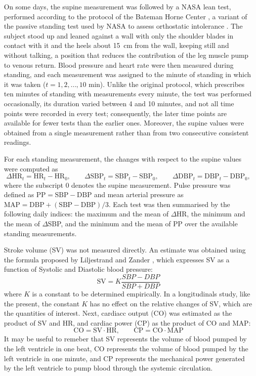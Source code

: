 \documentclass[11pt,a4paper]{article}
\begin{document}
On some days, the supine measurement was followed by a NASA lean test, performed
according to the protocol of the Bateman Horne Center \citep{bhc_nasa_lean}, a
variant of the passive standing test used by NASA to assess orthostatic intolerance
\citep{bungo1985}. The subject stood up and leaned against a wall with only the
shoulder blades in contact with it and the heels about \SI{15}{\centi\metre} from the
wall, keeping still and without talking, a position that reduces the contribution of
the leg muscle pump to venous return. Blood pressure and heart rate were then measured
during standing, and each measurement was assigned to the minute of standing in which
it was taken ($t = 1, 2, \dots, 10$ min). Unlike the original protocol, which
prescribes ten minutes of standing with measurements every minute, the test was
performed occasionally, its duration varied between 4 and 10 minutes, and not all
time points were recorded in every test; consequently, the later time points are
available for fewer tests than the earlier ones. Moreover, the supine values were
obtained from a single measurement rather than from two consecutive consistent
readings.

For each standing measurement, the changes with respect to the supine values were
computed as
\begin{equation}
  \Delta\mathrm{HR}_t = \mathrm{HR}_t - \mathrm{HR}_0, \qquad
  \Delta\mathrm{SBP}_t = \mathrm{SBP}_t - \mathrm{SBP}_0, \qquad
  \Delta\mathrm{DBP}_t = \mathrm{DBP}_t - \mathrm{DBP}_0,
\end{equation}
where the subscript $0$ denotes the supine measurement. Pulse pressure was defined as
$\mathrm{PP} = \mathrm{SBP} - \mathrm{DBP}$ and mean arterial pressure as
$\mathrm{MAP} = \mathrm{DBP} + (\mathrm{SBP} - \mathrm{DBP})/3$. Each test was then
summarised by the following daily indices: the maximum and the mean of $\Delta$HR,
the minimum and the mean of $\Delta$SBP, and the minimum and the mean of PP over the
available standing measurements.

Stroke volume (SV) was not measured directly. An estimate was obtained using the formula proposed 
by Liljestrand and Zander \citep{liljestrand1928}, which expresses SV as a function of Systolic 
and Diastolic blood pressure:
\begin{equation}
  \mathrm{SV} = K\frac{SBP - DBP}{SBP + DBP}
\end{equation}
where $K$ is a constant to be determined empirically. In a longitudinals study, like the present, 
the constant $K$ has no effect on the relative changes of SV, which are the quantities of interest. 
Next, cardiacc output (CO) was estimated as the product of SV and HR, and cardiac power (CP) as 
the product of CO and  MAP:
\begin{equation}
  \mathrm{CO} = \mathrm{SV} \cdot \mathrm{HR}, \qquad
  \mathrm{CP} = \mathrm{CO} \cdot \mathrm{MAP}
\end{equation}
It may be useful to remeber that SV represents the volume of blood pumped by the left ventricle in one beat, 
CO represents the volume of blood pumped by the left ventricle in one minute, and CP represents the mechanical
power generated by the left ventricle to pump blood through the systemic circulation. 
\end{document}
